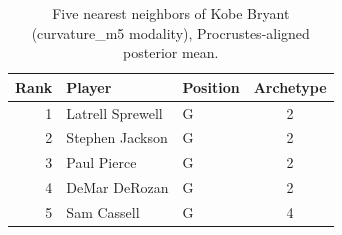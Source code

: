 \begin{table}[htbp]
  \centering\small
  \begin{tabular}{rllc}
    \toprule
    Rank & Player & Position & Archetype \\
    \midrule
    1 & Latrell Sprewell & G & 2 \\
    2 & Stephen Jackson & G & 2 \\
    3 & Paul Pierce & G & 2 \\
    4 & DeMar DeRozan & G & 2 \\
    5 & Sam Cassell & G & 4 \\
    \bottomrule
  \end{tabular}
  \caption{Five nearest neighbors of Kobe Bryant (curvature_m5 modality), Procrustes-aligned posterior mean.}
  \label{tab:Kobe_Bryant_neighbors_curvature_m5}
\end{table}

